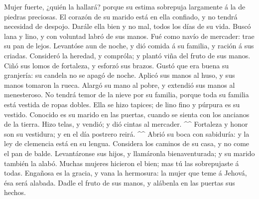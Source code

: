  Mujer fuerte, ¿quién la hallará? porque su estima
sobrepuja largamente á la de piedras preciosas.  El corazón
de su marido está en ella confiado, y no tendrá necesidad de despojo.
 Darále ella bien y no mal, todos los días de su vida.
 Buscó lana y lino, y con voluntad labró de sus manos.
 Fué como navío de mercader: trae su pan de lejos.
 Levantóse aun de noche, y dió comida á su familia, y
ración á sus criadas.  Consideró la heredad, y compróla; y
plantó viña del fruto de sus manos.  Ciñó sus lomos de
fortaleza, y esforzó sus brazos.  Gustó que era buena su
granjería: su candela no se apagó de noche.  Aplicó sus
manos al huso, y sus manos tomaron la rueca.  Alargó su
mano al pobre, y extendió sus manos al menesteroso.  No
tendrá temor de la nieve por su familia, porque toda su familia está
vestida de ropas dobles.  Ella se hizo tapices; de lino
fino y púrpura es su vestido.  Conocido es su marido en las
puertas, cuando se sienta con los ancianos de la tierra. 
Hizo telas, y vendió; y dió cintas al mercader. \^{}\^{} 
Fortaleza y honor son su vestidura; y en el día postrero reirá. \^{}\^{}
 Abrió su boca con sabiduría: y la ley de clemencia está en
su lengua.  Considera los caminos de su casa, y no come el
pan de balde.  Levantáronse sus hijos, y llamáronla
bienaventurada; y su marido también la alabó.  Muchas
mujeres hicieron el bien; mas tú las sobrepujaste á todas. 
Engañosa es la gracia, y vana la hermosura: la mujer que teme á Jehová,
ésa será alabada.  Dadle el fruto de sus manos, y alábenla
en las puertas sus hechos.

